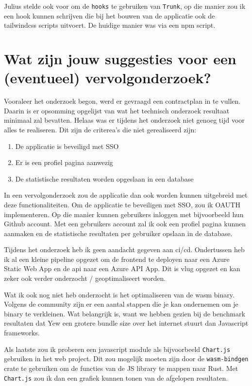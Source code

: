 Julius stelde ook voor om de \texttt{hooks} te gebruiken van \texttt{Trunk}, op
die manier zou ik een hook kunnen schrijven die bij het bouwen van de applicatie ook de tailwindcss
scripts uitvoert. De huidige manier was via een npm script.

\section{Wat zijn jouw suggesties voor een (eventueel) vervolgonderzoek?}

Vooraleer het onderzoek begon, werd er gevraagd een contractplan in te vullen. Daarin is er
opsomming opgelijst van wat het technisch onderzoek resultaat minimaal zal bevatten. Helaas was er
tijdens het onderzoek niet genoeg tijd voor alles te realiseren. Dit zijn de criterea's die niet
gerealiseerd zijn:
\begin{enumerate}
  \item De applicatie is beveiligd met SSO
  \item Er is een profiel pagina aanwezig
  \item De statistische resultaten worden opgeslaan in een database
\end{enumerate}
In een vervolgonderzoek zou de applicatie dan ook worden kunnen uitgebreid met deze
functionaliteiten. Om de applicatie te beveiligen met SSO, zou ik OAUTH implementeren. Op die manier
kunnen gebruikers inloggen met bijvoorbeeld hun Github account.  Met een gebruikers account zal ik
ook een profiel pagina kunnen aanmaken en de statistische resultaten per gebruiker opslaan in de
database.

Tijdens het onderzoek heb ik geen aandacht gegeven aan ci/cd. Ondertussen heb ik al een kleine
pipeline opgezet om de frontend te deployen naar een Azure Static Web App en de api naar een Azure
API App. Dit is vlug opgezet en kan zeker ook verder onderzocht / geoptimaliseert worden.

Wat ik ook nog niet heb onderzocht is het optimaliseren van de wasm binary.\cite{wasm_size} Volgens
de community zijn er een aantal stappen die je kan ondernemen om je binary te verkleinen. Wat
belangrijk is, want we hebben gezien bij de benchmark resultaten dat Yew een grotere bundle size
over het internet stuurt dan Javascript frameworks.

Als laatste zou ik proberen een javascript module als bijvoorbeeld \texttt{Chart.js}
gebruiken in het web project. Dit zou mogelijk moeten zijn door de \texttt{wasm-bindgen}
crate te gebruiken om de functies van de JS library te mappen naar Rust. Met
\texttt{Chart.js} zou ik dan een grafiek kunnen tonen van de afgelopen resultaten.
